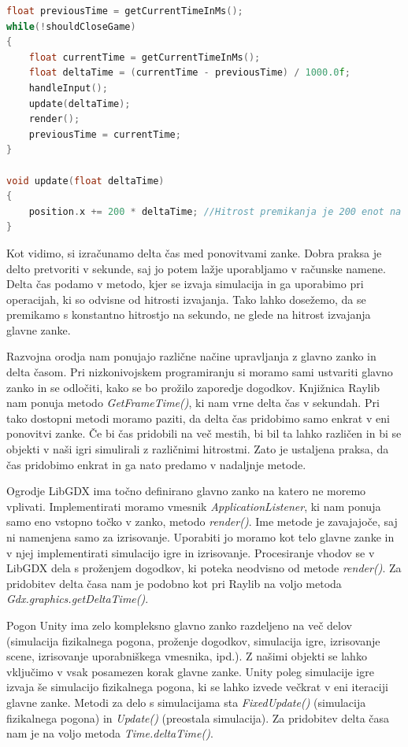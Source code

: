\documentclass[12pt,a4paper,twoside]{book}
\begin{document}
\begin{lstlisting}[label=code:deltaTime, language=C++, caption=Neodvisno gibanje]
float previousTime = getCurrentTimeInMs();
while(!shouldCloseGame)
{
	float currentTime = getCurrentTimeInMs();
	float deltaTime = (currentTime - previousTime) / 1000.0f;
	handleInput();
	update(deltaTime);
	render();
	previousTime = currentTime;
}

void update(float deltaTime)
{
	position.x += 200 * deltaTime; //Hitrost premikanja je 200 enot na sekundo
}
\end{lstlisting}
Kot vidimo, si izračunamo delta čas med ponovitvami zanke. Dobra praksa je delto pretvoriti v sekunde, saj jo potem lažje uporabljamo v računske namene. Delta čas podamo v metodo, kjer se izvaja simulacija in ga uporabimo pri operacijah, ki so odvisne od hitrosti izvajanja. Tako lahko dosežemo, da se premikamo s konstantno hitrostjo na sekundo, ne glede na hitrost izvajanja glavne zanke.

Razvojna orodja nam ponujajo različne načine upravljanja z glavno zanko in delta časom. Pri nizkonivojskem programiranju si moramo sami ustvariti glavno zanko in se odločiti, kako se bo prožilo zaporedje dogodkov. Knjižnica Raylib nam ponuja metodo \textit{GetFrameTime()}, ki nam vrne delta čas v sekundah. Pri tako dostopni metodi moramo paziti, da delta čas pridobimo samo enkrat v eni ponovitvi zanke. Če bi čas pridobili na več mestih, bi bil ta lahko različen in bi se objekti v naši igri simulirali z različnimi hitrostmi. Zato je ustaljena praksa, da čas pridobimo enkrat in ga nato predamo v nadaljnje metode.

Ogrodje LibGDX ima točno definirano glavno zanko na katero ne moremo vplivati. Implementirati moramo vmesnik \textit{ApplicationListener}, ki nam ponuja samo eno vstopno točko v zanko, metodo \textit{render()}. Ime metode je zavajajoče, saj ni namenjena samo za izrisovanje. Uporabiti jo moramo kot telo glavne zanke in v njej implementirati simulacijo igre in izrisovanje. Procesiranje vhodov se v LibGDX dela s proženjem dogodkov, ki poteka neodvisno od metode \textit{render()}. Za pridobitev delta časa nam je podobno kot pri Raylib na voljo metoda \textit{Gdx.graphics.getDeltaTime()}.

Pogon Unity ima zelo kompleksno glavno zanko razdeljeno na več delov (simulacija fizikalnega pogona, proženje dogodkov, simulacija igre, izrisovanje scene, izrisovanje uporabniškega vmesnika, ipd.). Z našimi objekti se lahko vključimo v vsak posamezen korak glavne zanke. Unity poleg simulacije igre izvaja še simulacijo fizikalnega pogona, ki se lahko izvede večkrat v eni iteraciji glavne zanke. Metodi za delo s simulacijama sta \textit{FixedUpdate()} (simulacija fizikalnega pogona) in \textit{Update()} (preostala simulacija). Za pridobitev delta časa nam je na voljo metoda \textit{Time.deltaTime()}.
\end{document}
